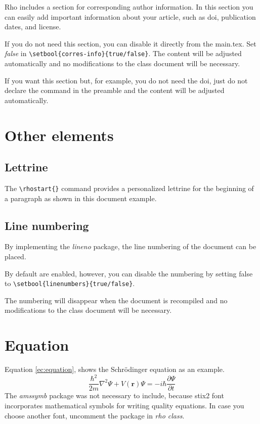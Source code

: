 \documentclass[9pt,a4paper,twoside]{rho-class/rho}
\begin{document}
        Rho includes a section for corresponding author information. In this section you can easily add important information about your article, such as doi, publication dates, and license.

        If you do not need this section, you can disable it directly from the main.tex. Set \textit{false} in \verb|\setbool{corres-info}{true/false}|. The content will be adjusted automatically and no modifications to the class document will be necessary.
        
        If you want this section but, for example, you do not need the doi, just do not declare the command in the preamble and the content will be adjusted automatically.

\section{Other elements}

    \subsection{Lettrine}
    
        The \verb*|\rhostart{}| command provides a personalized lettrine for the beginning of a paragraph as shown in this document example.

    \subsection{Line numbering}

        By implementing the \textit{lineno} package, the line numbering of the document can be placed.

        By default are enabled, however, you can disable the numbering by setting false to \verb|\setbool{linenumbers}{true/false}|. 

        The numbering will disappear when the document is recompiled and no modifications to the class document will be necessary.

\section{Equation}

    Equation \ref{ec:equation}, shows the Schrödinger equation as an example. 
        \begin{equation} \label{ec:equation}
            \frac{\hbar^2}{2m}\nabla^2\Psi + V(\mathbf{r})\Psi = -i\hbar \frac{\partial\Psi}{\partial t}
        \end{equation} 
    The \textit{amssymb} package was not necessary to include, because stix2 font incorporates mathematical symbols for writing quality equations. In case you choose another font, uncomment the package in \textit{rho class}.
\end{document}
